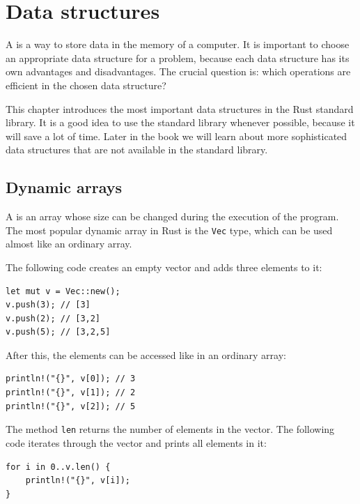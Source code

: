 \chapter{Data structures}


A  is a way to store
data in the memory of a computer.
It is important to choose an appropriate
data structure for a problem,
because each data structure has its own
advantages and disadvantages.
The crucial question is: which operations
are efficient in the chosen data structure?

This chapter introduces the most important
data structures in the Rust standard library.
It is a good idea to use the standard library
whenever possible,
because it will save a lot of time.
Later in the book we will learn about more sophisticated
data structures that are not available
in the standard library.

\section{Dynamic arrays}


A  is an array whose
size can be changed during the execution
of the program.
The most popular dynamic array in Rust is
the \texttt{Vec} type,
which can be used almost like an ordinary array.

The following code creates an empty vector and
adds three elements to it:

\begin{lstlisting}
let mut v = Vec::new();
v.push(3); // [3]
v.push(2); // [3,2]
v.push(5); // [3,2,5]
\end{lstlisting}

After this, the elements can be accessed like in an ordinary array:

\begin{lstlisting}
println!("{}", v[0]); // 3
println!("{}", v[1]); // 2
println!("{}", v[2]); // 5
\end{lstlisting}

The method \texttt{len} returns the number of elements in the vector.
The following code iterates through
the vector and prints all elements in it:

\begin{lstlisting}
for i in 0..v.len() {
    println!("{}", v[i]);
}
\end{lstlisting}

